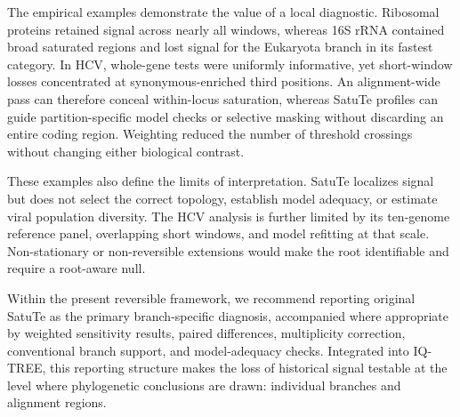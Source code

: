 The empirical examples demonstrate the value of a local diagnostic. Ribosomal proteins retained signal across nearly all windows, whereas 16S rRNA contained broad saturated regions and lost signal for the Eukaryota branch in its fastest category. In HCV, whole-gene tests were uniformly informative, yet short-window losses concentrated at synonymous-enriched third positions. An alignment-wide pass can therefore conceal within-locus saturation, whereas SatuTe profiles can guide partition-specific model checks or selective masking without discarding an entire coding region. Weighting reduced the number of threshold crossings without changing either biological contrast.

These examples also define the limits of interpretation. SatuTe localizes signal but does not select the correct topology, establish model adequacy, or estimate viral population diversity. The HCV analysis is further limited by its ten-genome reference panel, overlapping short windows, and model refitting at that scale. Non-stationary or non-reversible extensions would make the root identifiable and require a root-aware null.

Within the present reversible framework, we recommend reporting original SatuTe as the primary branch-specific diagnosis, accompanied where appropriate by weighted sensitivity results, paired differences, multiplicity correction, conventional branch support, and model-adequacy checks. Integrated into IQ-TREE, this reporting structure makes the loss of historical signal testable at the level where phylogenetic conclusions are drawn: individual branches and alignment regions.

